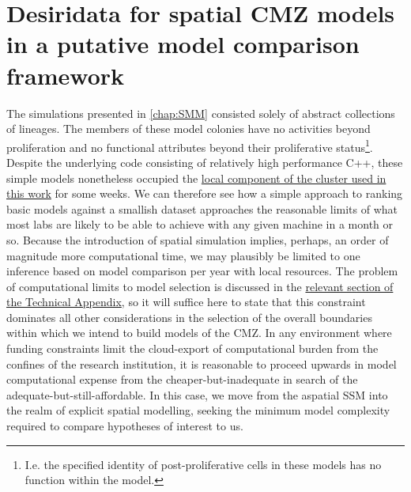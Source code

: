 \section{Desiridata for spatial CMZ models in a putative model comparison framework}
The simulations presented in \autoref{chap:SMM} consisted solely of abstract collections of lineages. The members of these model colonies have no activities beyond proliferation and no functional attributes beyond their proliferative status\footnote{I.e. the specified identity of post-proliferative cells in these models has no function within the model.}. Despite the underlying code consisting of relatively high performance C++, these simple models nonetheless occupied the \hyperref[cluster]{local component of the cluster used in this work} for some weeks. We can therefore see how a simple approach to ranking basic models against a smallish dataset approaches the reasonable limits of what most labs are likely to be able to achieve with any given machine in a month or so. Because the introduction of spatial simulation implies, perhaps, an order of magnitude more computational time, we may plausibly be limited to one inference based on model comparison per year with local resources. The problem of computational limits to model selection is discussed in the \hyperref[complimits]{relevant section of the Technical Appendix}, so it will suffice here to state that this constraint dominates all other considerations in the selection of the overall boundaries within which we intend to build models of the CMZ. In any environment where funding constraints limit the cloud-export of computational burden from the confines of the research institution, it is reasonable to proceed upwards in model computational expense from the cheaper-but-inadequate in search of the adequate-but-still-affordable. In this case, we move from the aspatial SSM into the realm of explicit spatial modelling, seeking the minimum model complexity required to compare hypotheses of interest to us.

